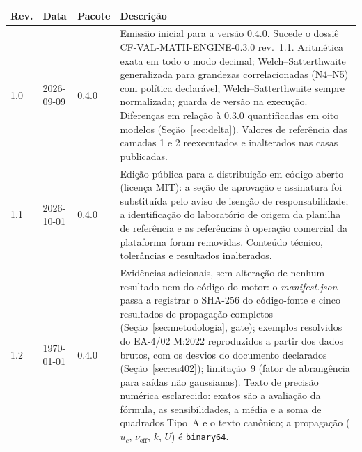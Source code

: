 \documentclass[11pt,a4paper]{article}
\newcommand{\docVersion}{0.4.0}
\newcommand{\docRevision}{1.2}
\newcommand{\docDate}{\today}
\begin{document}
\begin{tabularx}{\textwidth}{l l l X}
  \toprule
  \textbf{Rev.} & \textbf{Data} & \textbf{Pacote} & \textbf{Descrição} \\
  \midrule
  1.0 & 2026-09-09 & \docVersion & Emissão inicial para a versão \docVersion{}. Sucede o dossiê CF-VAL-MATH-ENGINE-0.3.0 rev.\ 1.1. Aritmética exata em todo o modo decimal; Welch--Satterthwaite generalizada para grandezas correlacionadas (N4--N5) com política declarável; Welch--Satterthwaite sempre normalizada; guarda de versão na execução. Diferenças em relação à 0.3.0 quantificadas em oito modelos (Seção~\ref{sec:delta}). Valores de referência das camadas 1 e 2 reexecutados e inalterados nas casas publicadas. \\
  1.1 & 2026-10-01 & \docVersion & Edição pública para a distribuição em código aberto (licença MIT): a seção de aprovação e assinatura foi substituída pelo aviso de isenção de responsabilidade; a identificação do laboratório de origem da planilha de referência e as referências à operação comercial da plataforma foram removidas. Conteúdo técnico, tolerâncias e resultados inalterados. \\
  \docRevision & \docDate & \docVersion & Evidências adicionais, sem alteração de nenhum resultado nem do código do motor: o \emph{manifest.json} passa a registrar o SHA-256 do código-fonte e cinco resultados de propagação completos (Seção~\ref{sec:metodologia}, gate); exemplos resolvidos do EA-4/02 M:2022 reproduzidos a partir dos dados brutos, com os desvios do documento declarados (Seção~\ref{sec:ea402}); limitação~9 (fator de abrangência para saídas não gaussianas). Texto de precisão numérica esclarecido: exatos são a avaliação da fórmula, as sensibilidades, a média e a soma de quadrados Tipo~A e o texto canônico; a propagação (\(u_c\), \(\nu_{\text{eff}}\), \(k\), \(U\)) é \texttt{binary64}. \\
  \bottomrule
\end{tabularx}
\end{document}
